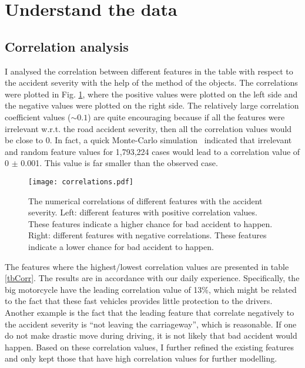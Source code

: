 \documentclass[12pt,a4paper]{article}
\begin{document}
\section{Understand the data}

\subsection{Correlation analysis}

I analysed the correlation between different features in the table with respect to the accident severity with the help of the  method of the  objects. The correlations were plotted in Fig. \ref{figCorr}, where the positive values were plotted on the left side and the negative values were plotted on the right side. The relatively large correlation coefficient values ($\sim 0.1$) are quite encouraging because if all the features were irrelevant w.r.t. the road accident severity, then all the correlation values would be close to 0. In fact, a quick Monte-Carlo simulation\footnotemark 
\ indicated that irrelevant and random feature values for 1,793,224 cases would lead to a correlation value of 0 $\pm$ 0.001.
This value is far smaller than the observed case.\footnotemark
{}



\begin{figure}
\centering
\texttt{[image: correlations.pdf]}
\caption{The numerical correlations of different features with the accident severity. Left: different features with positive correlation values. These features indicate a higher chance for bad accident to happen. Right: different features with negative correlations. These features indicate a lower chance for bad accident to happen.}
\label{figCorr}
\end{figure}


The features where the highest/lowest correlation values are presented in table \ref{tbCorr}. The results are in accordance with our daily experience. Specifically, the big motorcycle have the leading correlation value of 13\%, which might be related to the fact that these fast vehicles provides little protection to the drivers. Another example is the fact that the leading feature that correlate negatively to the accident severity is ``not leaving the carriageway'', which is reasonable. If one do not make drastic move during driving, it is not likely that bad accident would happen. Based on these correlation values, I further refined the existing features and only kept those that have high correlation values for further modelling.
\end{document}
